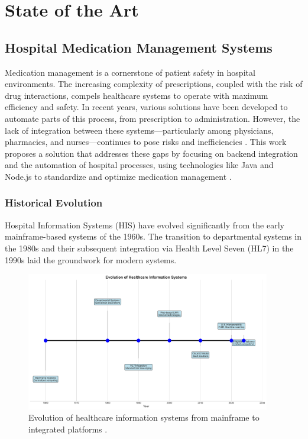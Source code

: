 \chapter{State of the Art}

\section{Hospital Medication Management Systems}

Medication management is a cornerstone of patient safety in hospital environments. The increasing complexity of prescriptions, coupled with the risk of drug interactions, compels healthcare systems to operate with maximum efficiency and safety. In recent years, various solutions have been developed to automate parts of this process, from prescription to administration. However, the lack of integration between these systems—particularly among physicians, pharmacies, and nurses—continues to pose risks and inefficiencies \cite{bowles2020integrating, kallio2020}. This work proposes a solution that addresses these gaps by focusing on backend integration and the automation of hospital processes, using technologies like Java and Node.js to standardize and optimize medication management \cite{Ghobadi2022}.

\subsection{Historical Evolution}

Hospital Information Systems (HIS) have evolved significantly from the early mainframe-based systems of the 1960s. The transition to departmental systems in the 1980s and their subsequent integration via Health Level Seven (HL7) \cite{dolin2006, mandl2020} in the 1990s laid the groundwork for modern systems.

\begin{figure}[htbp]
    \centering
    \includegraphics[width=0.95\textwidth]{images/generated/healthcare_it_timeline.png}
    \caption{Evolution of healthcare information systems from mainframe to integrated platforms \citep{shermock2023, vaghasiya2023}.}
    \label{fig:timeline}
\end{figure}

